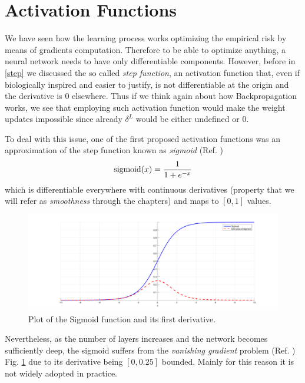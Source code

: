 \documentclass[LaM,binding=0.6cm]{./packages/sapthesis/sapthesis}
\begin{document}
        \section{Activation Functions}
            
            We have seen how the learning process works optimizing the empirical risk by means of gradients computation.
            Therefore to be able to optimize anything, a neural network needs to have only differentiable components.
            However, before in \ref{step} we discussed the so called \textit{step function}, an activation function that, 
            even if biologically inspired and easier to justify, is not differentiable at the origin and the derivative is 0 elsewhere.
            Thus if we think again about how Backpropagation works, we see that employing such activation function would make the weight updates impossible
            since already $ \delta^{L} $ would be either undefined or 0.

            To deal with this issue, one of the first proposed activation functions was an approximation of the step function known as \textit{sigmoid} (Ref. ) 
            \begin{equation}
                \textnormal{sigmoid}(x) = \frac{1}{1 + e^{-x}}
            \end{equation}
            which is differentiable everywhere with continuous derivatives (property that we will refer as \textit{smoothness} through the chapters) and
            maps to $ [0, 1] $ values.
            \begin{figure}[h]
                \centering
                \includegraphics[width=1\textwidth]{sig_der}
                \caption{Plot of the Sigmoid function and its first derivative.}
                \label{fig:sigmoid}
            \end{figure}
            Nevertheless, as the number of layers increases and the network becomes sufficiently deep, the sigmoid suffers from the \textit{vanishing gradient} problem (Ref. ) Fig. \ref{fig:sigmoid}
            due to its derivative being $[0, 0.25]$ bounded. Mainly for this reason it is not widely adopted in practice.
\end{document}
